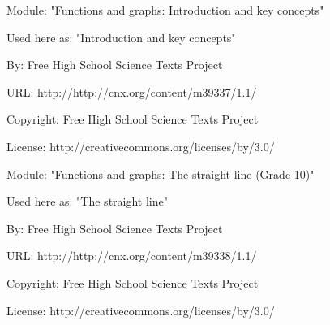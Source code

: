       \par\vspace{9pt}\noindent\begin{minipage}{\textwidth}
      Module: "Functions and graphs: Introduction and key concepts" \par\nopagebreak\noindent
      Used here as: "Introduction and key concepts" \par\nopagebreak\noindent
        By: Free High School Science Texts Project\par\nopagebreak\noindent
      URL: http://http://cnx.org/content/m39337/1.1/\par\nopagebreak\noindent
      \par\nopagebreak\noindent
      Copyright: Free High School Science Texts Project\par\nopagebreak\noindent
      License:  http://creativecommons.org/licenses/by/3.0/\par\nopagebreak\noindent
      \par\end{minipage}
      \par\vspace{9pt}\noindent\begin{minipage}{\textwidth}
      Module: "Functions and graphs: The straight line (Grade 10)" \par\nopagebreak\noindent
      Used here as: "The straight line" \par\nopagebreak\noindent
        By: Free High School Science Texts Project\par\nopagebreak\noindent
      URL: http://http://cnx.org/content/m39338/1.1/\par\nopagebreak\noindent
      \par\nopagebreak\noindent
      Copyright: Free High School Science Texts Project\par\nopagebreak\noindent
      License:  http://creativecommons.org/licenses/by/3.0/\par\nopagebreak\noindent
      \par\end{minipage}
